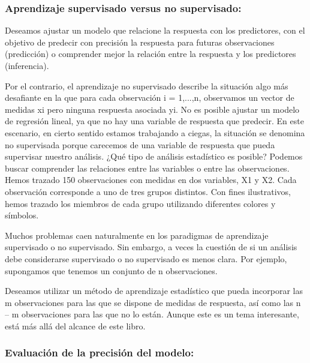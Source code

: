 \documentclass[
  letterpaper,
  DIV=11,
  numbers=noendperiod]{scrartcl}
\begin{document}
\hypertarget{aprendizaje-supervisado-versus-no-supervisado}{%
\subsubsection{\texorpdfstring{\textbf{Aprendizaje supervisado versus no
supervisado:}}{Aprendizaje supervisado versus no supervisado:}}\label{aprendizaje-supervisado-versus-no-supervisado}}

Deseamos ajustar un modelo que relacione la respuesta con los
predictores, con el objetivo de predecir con precisión la respuesta para
futuras observaciones (predicción) o comprender mejor la relación entre
la respuesta y los predictores (inferencia).

Por el contrario, el aprendizaje no supervisado describe la situación
algo más desafiante en la que para cada observación i = 1,...,n,
observamos un vector de medidas xi pero ninguna respuesta asociada yi.
No es posible ajustar un modelo de regresión lineal, ya que no hay una
variable de respuesta que predecir. En este escenario, en cierto sentido
estamos trabajando a ciegas, la situación se denomina no supervisada
porque carecemos de una variable de respuesta que pueda supervisar
nuestro análisis. ¿Qué tipo de análisis estadístico es posible? Podemos
buscar comprender las relaciones entre las variables o entre las
observaciones. Hemos trazado 150 observaciones con medidas en dos
variables, X1 y X2. Cada observación corresponde a uno de tres grupos
distintos. Con fines ilustrativos, hemos trazado los miembros de cada
grupo utilizando diferentes colores y símbolos.

Muchos problemas caen naturalmente en los paradigmas de aprendizaje
supervisado o no supervisado. Sin embargo, a veces la cuestión de si un
análisis debe considerarse supervisado o no supervisado es menos clara.
Por ejemplo, supongamos que tenemos un conjunto de n observaciones.

Deseamos utilizar un método de aprendizaje estadístico que pueda
incorporar las m observaciones para las que se dispone de medidas de
respuesta, así como las n -- m observaciones para las que no lo están.
Aunque este es un tema interesante, está más allá del alcance de este
libro.

\hypertarget{evaluaciuxf3n-de-la-precisiuxf3n-del-modelo}{%
\subsubsection{\texorpdfstring{\textbf{Evaluación de la precisión del
modelo:}}{Evaluación de la precisión del modelo:}}\label{evaluaciuxf3n-de-la-precisiuxf3n-del-modelo}}
\end{document}
